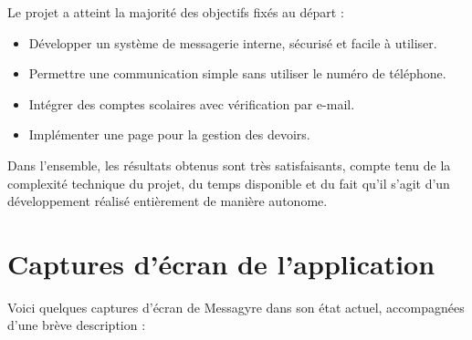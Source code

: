 \documentclass[12pt]{report}
\begin{document}
	Le projet a atteint la majorité des objectifs fixés au départ :
	
	\begin{itemize}
		\item Développer un système de messagerie interne, sécurisé et facile à utiliser.
		\item Permettre une communication simple sans utiliser le numéro de téléphone.
		\item Intégrer des comptes scolaires avec vérification par e-mail.
		\item Implémenter une page pour la gestion des devoirs.
	\end{itemize}
	
	Dans l’ensemble, les résultats obtenus sont très satisfaisants, compte tenu de la complexité technique du projet, du temps disponible et du fait qu’il s’agit d’un développement réalisé entièrement de manière autonome.
	
	\section{Captures d’écran de l’application}
	
	Voici quelques captures d’écran de Messagyre dans son état actuel, accompagnées d’une brève description :
	
\end{document}
